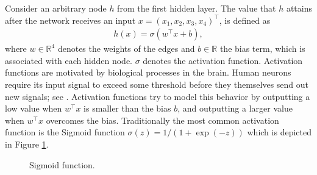 Consider an arbitrary node $h$ from the first hidden layer. The value that $h$ attains
after the network receives an input $x = (x_1, x_2, x_3, x_4)^\top$, is defined as
\begin{align*}
    h(x) = \sigma(w^\top x + b),
\end{align*}
where $w \in \mathbb{R}^4$ denotes the weights of the edges and $b \in \mathbb{R}$ the
bias term, which is associated with each hidden node. $\sigma$ denotes the activation
function. Activation functions are motivated by biological processes in the brain. Human
neurons require its input signal to exceed some threshold before they themselves send
out new signals; see \cite{Goodfellow.2016}. Activation functions try to model this
behavior by outputting a low value when $w^\top x$ is smaller than the bias $b$, and
outputting a larger value when $w^\top x$ overcomes the bias. Traditionally the most
common activation function is the Sigmoid function $\sigma(z) = {1}/{(1 + \exp(-z))}$
which is depicted in Figure \ref{fig:sigmoid_function}.

\begin{figure}[!ht]
\centering
{}
\caption{Sigmoid function.}\label{fig:sigmoid_function}
\end{figure}

